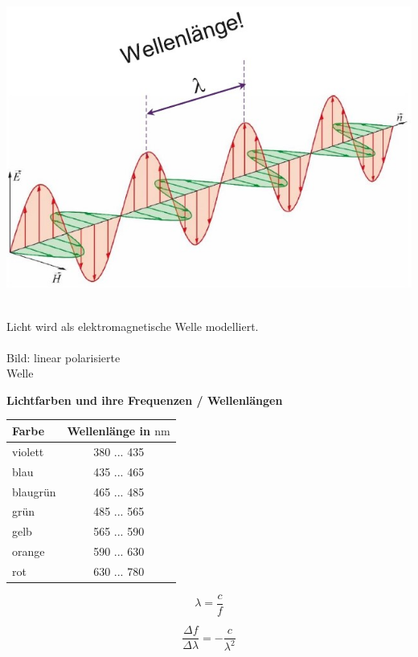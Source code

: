\begin{minipage}{0.48\linewidth}
\includegraphics[width=\linewidth]{Bilder/Wellen-Optik/lichtwelle} \\
\\
\end{minipage}
\hfill
\begin{minipage}{0.48\linewidth}
Licht wird als elektromagnetische Welle modelliert.  \\
\\
Bild: linear polarisierte \\
Welle \\
\end{minipage}

\textbf{Lichtfarben und ihre Frequenzen / Wellenlängen} \\
\begin{minipage}{0.5\linewidth}
	\begin{tabular}{| l | c |}
		\hline
		\textbf{Farbe} & \textbf{Wellenlänge in $\mathrm{nm}$} \\
		\hline
		\color{red!50!blue!80!white}violett & 380 ... 435 \\
		\hline
		\color{blue}blau & 435 ... 465 \\
		\hline
		\color[HTML]{35c2bd}blaugrün & 465 ... 485 \\
		\hline
		\color{green!80!black}grün & 485 ... 565 \\
		\hline
		\color{yellow!75!red}gelb & 565 ... 590 \\
		\hline
		\color{orange}orange & 590 ... 630 \\
		\hline
		\color{red}rot & 630 ... 780 \\
		\hline
	\end{tabular}
\end{minipage}
	\hfill
\begin{minipage}{0.5\linewidth}
	\begin{center}
		$$ \boxed{ \lambda = \frac{c}{f} } $$

		$$ \boxed{ \frac{\Delta f}{\Delta \lambda} = -\frac{c}{\lambda^2} } $$
	\end{center}
\end{minipage}

